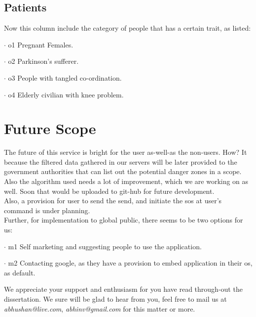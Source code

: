 \clearpage

\subsection{Patients}
\label{subsec:subsec02}

Now this column include the category of people that has a certain trait, as listed:
  \begin{description}

\item{$\cdot$ o1} Pregnant Females.
\item{$\cdot$ o2} Parkinson's sufferer.
\item{$\cdot$ o3} People with tangled co-ordination.
\item{$\cdot$ o4} Elderly civilian with knee problem.

\end{description}




\section{Future Scope}
\label{sec:sec02}

The future of this service is bright for the user as-well-as the non-users.
How? It because the filtered data gathered in our servers will be later provided to the government authorities that can list out the potential danger zones in a scope. \\
Also the algorithm used needs a lot of improvement, which we are working on as well. Soon that would be uploaded to git-hub for future development. \\
Also, a provision for user to send the send, and initiate the sos at user's command is under planning. \\
Further, for implementation to global public, there seems to be two options for us:
\begin{description}
\item{$\cdot$ m1} Self marketing and suggesting people to use the application.
\item{$\cdot$ m2} Contacting google, as they have a provision to embed application in their os, as default.
\end{description}

We appreciate your support and enthusiasm for you have read through-out the dissertation. We sure will be glad to hear from you, feel free to mail us at \textit{abhushan@live.com},\textit{ abhinv@gmail.com} for this matter or more.

\newpage\null\thispagestyle{empty}\newpage

